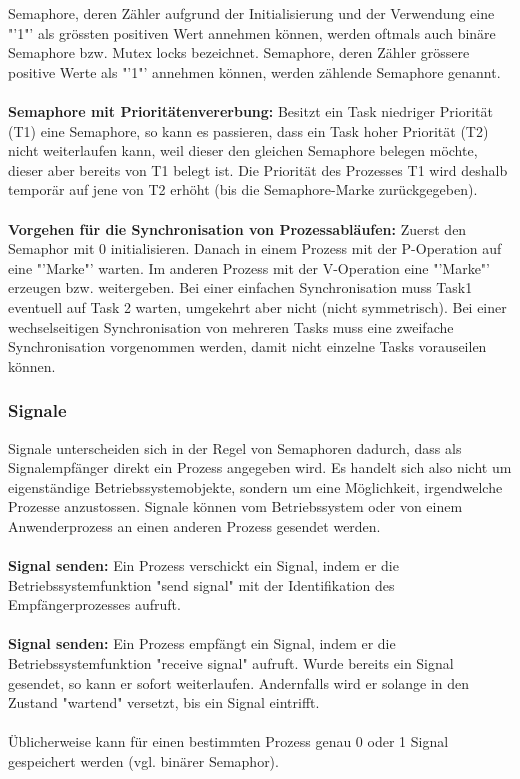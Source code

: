 Semaphore, deren Zähler aufgrund der Initialisierung und der Verwendung eine "'1"' als grössten positiven Wert annehmen können, werden oftmals auch binäre Semaphore bzw. Mutex locks bezeichnet. Semaphore, deren Zähler grössere positive Werte als "'1"' annehmen können, werden zählende Semaphore genannt.\\\\
\textbf{Semaphore mit Prioritätenvererbung:} Besitzt ein Task niedriger Priorität (T1) eine Semaphore, so kann es passieren, dass ein Task hoher Priorität (T2) nicht weiterlaufen kann, weil dieser den gleichen Semaphore belegen möchte, dieser aber bereits von T1 belegt ist. Die Priorität des Prozesses T1 wird deshalb temporär auf jene von T2 erhöht (bis die Semaphore-Marke zurückgegeben).\\\\
\textbf{Vorgehen für die Synchronisation von Prozessabläufen:} Zuerst den Semaphor mit 0 initialisieren. Danach in einem Prozess mit der P-Operation auf eine "'Marke"' warten. Im anderen Prozess mit der V-Operation eine "'Marke"' erzeugen bzw. weitergeben. Bei einer einfachen Synchronisation muss Task1 eventuell auf Task 2 warten, umgekehrt aber nicht (nicht symmetrisch). Bei einer wechselseitigen Synchronisation von mehreren Tasks muss eine zweifache Synchronisation vorgenommen werden, damit nicht einzelne Tasks vorauseilen können. 

\subsubsection{Signale}
Signale unterscheiden sich in der Regel von Semaphoren dadurch, dass als
Signalempfänger direkt ein Prozess angegeben wird. Es handelt sich also nicht
um eigenständige Betriebssystemobjekte, sondern um eine Möglichkeit, irgendwelche
Prozesse anzustossen. Signale können vom Betriebssystem oder von einem Anwenderprozess an einen anderen Prozess gesendet werden.\\\\
\textbf{Signal senden:} Ein Prozess verschickt ein Signal, indem er die Betriebssystemfunktion
"send signal" mit der Identifikation des Empfängerprozesses aufruft.\\\\
\textbf{Signal senden:} Ein Prozess empfängt ein Signal, indem er die Betriebssystemfunktion "receive signal" aufruft. Wurde bereits ein Signal gesendet, so kann er sofort
weiterlaufen. Andernfalls wird er solange in den Zustand "wartend" versetzt, bis ein Signal eintrifft.\\\\
Üblicherweise kann für einen bestimmten Prozess genau 0 oder 1 Signal
gespeichert werden (vgl. binärer Semaphor).



